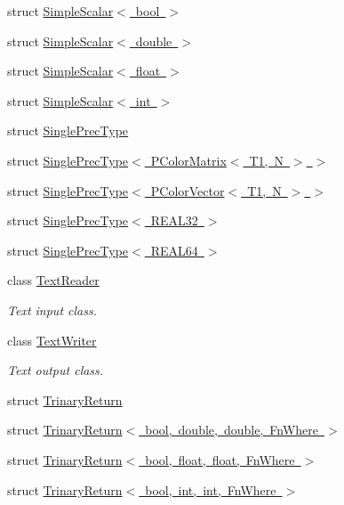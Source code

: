 \begin{DoxyCompactItemize}
struct \mbox{\hyperlink{structENSEM_1_1SimpleScalar_3_01bool_01_4}{Simple\+Scalar$<$ bool $>$}}
\item 
struct \mbox{\hyperlink{structENSEM_1_1SimpleScalar_3_01double_01_4}{Simple\+Scalar$<$ double $>$}}
\item 
struct \mbox{\hyperlink{structENSEM_1_1SimpleScalar_3_01float_01_4}{Simple\+Scalar$<$ float $>$}}
\item 
struct \mbox{\hyperlink{structENSEM_1_1SimpleScalar_3_01int_01_4}{Simple\+Scalar$<$ int $>$}}
\item 
struct \mbox{\hyperlink{structENSEM_1_1SinglePrecType}{Single\+Prec\+Type}}
\item 
struct \mbox{\hyperlink{structENSEM_1_1SinglePrecType_3_01PColorMatrix_3_01T1_00_01N_01_4_01_4}{Single\+Prec\+Type$<$ P\+Color\+Matrix$<$ T1, N $>$ $>$}}
\item 
struct \mbox{\hyperlink{structENSEM_1_1SinglePrecType_3_01PColorVector_3_01T1_00_01N_01_4_01_4}{Single\+Prec\+Type$<$ P\+Color\+Vector$<$ T1, N $>$ $>$}}
\item 
struct \mbox{\hyperlink{structENSEM_1_1SinglePrecType_3_01REAL32_01_4}{Single\+Prec\+Type$<$ R\+E\+A\+L32 $>$}}
\item 
struct \mbox{\hyperlink{structENSEM_1_1SinglePrecType_3_01REAL64_01_4}{Single\+Prec\+Type$<$ R\+E\+A\+L64 $>$}}
\item 
class \mbox{\hyperlink{classENSEM_1_1TextReader}{Text\+Reader}}
\begin{DoxyCompactList}\small\item\em Text input class. \end{DoxyCompactList}\item 
class \mbox{\hyperlink{classENSEM_1_1TextWriter}{Text\+Writer}}
\begin{DoxyCompactList}\small\item\em Text output class. \end{DoxyCompactList}\item 
struct \mbox{\hyperlink{structENSEM_1_1TrinaryReturn}{Trinary\+Return}}
\item 
struct \mbox{\hyperlink{structENSEM_1_1TrinaryReturn_3_01bool_00_01double_00_01double_00_01FnWhere_01_4}{Trinary\+Return$<$ bool, double, double, Fn\+Where $>$}}
\item 
struct \mbox{\hyperlink{structENSEM_1_1TrinaryReturn_3_01bool_00_01float_00_01float_00_01FnWhere_01_4}{Trinary\+Return$<$ bool, float, float, Fn\+Where $>$}}
\item 
struct \mbox{\hyperlink{structENSEM_1_1TrinaryReturn_3_01bool_00_01int_00_01int_00_01FnWhere_01_4}{Trinary\+Return$<$ bool, int, int, Fn\+Where $>$}}

\end{DoxyCompactItemize}
